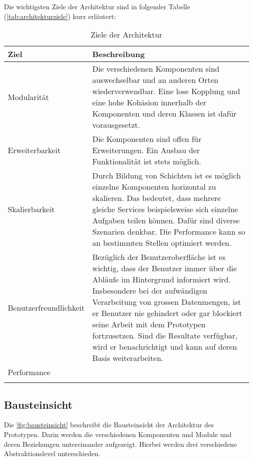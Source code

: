 Die wichtigsten Ziele der Architektur sind in folgender Tabelle (\autoref{tab:architekturziele}) kurz erläutert:

\begin{longtable}{|p{4.5cm}|p{8.5cm}|}

  \hline
    Ziel &  Beschreibung \\\hline
    Modularität & Die verschiedenen Komponenten sind auswechselbar und an anderen Orten wiederverwendbar. Eine lose Kopplung und eine hohe Kohäsion innerhalb der Komponenten und deren Klassen ist dafür vorausgesetzt.\\\hline
    Erweiterbarkeit & Die Komponenten sind offen für Erweiterungen. Ein Ausbau der Funktionalität ist stets möglich.\\\hline
    Skalierbarkeit & Durch Bildung von Schichten ist es möglich einzelne Komponenten horizontal zu skalieren. Das bedeutet, dass mehrere gleiche Services beispielsweise sich einzelne Aufgaben teilen können. Dafür sind diverse Szenarien denkbar. Die Performance kann so an bestimmten Stellen optimiert werden.\\\hline
    Benutzerfreundlichkeit & Bezüglich der Benutzeroberfläche ist es wichtig, dass der Benutzer immer über die Abläufe im Hintergrund informiert wird. Insbesondere bei der aufwändigen Verarbeitung von grossen Datenmengen, ist er Benutzer nie gehindert oder gar blockiert seine Arbeit mit dem Prototypen fortzusetzen. Sind die Resultate verfügbar, wird er benachrichtigt und kann auf deren Basis weiterarbeiten.\\\hline
    Performance & \\\hline
    \caption{Ziele der Architektur}
  \label{tab:architekturziele}
\end{longtable}



\subsection{Bausteinsicht}
Die \autoref{fig:bausteinsicht} beschreibt die Bausteinsicht der Architektur des Prototypen. Darin werden die verschiedenen Komponenten und Module und deren Beziehungen untereinander aufgezeigt. Hierbei werden drei verschiedene Abstraktionslevel unterschieden. 

